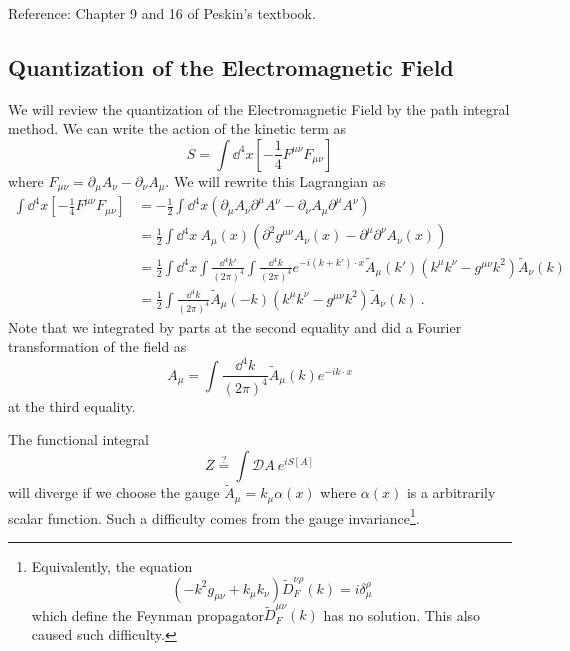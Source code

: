 \documentclass[a4paper,pdftex]{article}
\begin{document}
Reference: Chapter 9 and 16 of Peskin's textbook\cite{Peskin_IntroductionQuantum_1995}.

\subsection{Quantization of the Electromagnetic Field}

We will review the quantization of the Electromagnetic Field by the path integral method. We can write the action of the kinetic term as 
\begin{equation}
  S
  =
  \int\dd^4x \left[ -\frac{1}{4}F^{\mu\nu}F_{\mu\nu} \right]
\end{equation}
where $F_{\mu\nu}=\partial_{\mu}A_{\nu}-\partial_{\nu}A_{\mu}$. We will rewrite this Lagrangian as 
\begin{align}
  \int\dd^4x \left[ -\frac{1}{4}F^{\mu\nu}F_{\mu\nu} \right]
  &=
  -\frac{1}{2}
  \int\dd^4x
  (\partial_{\mu}A_{\nu}\partial^{\mu}A^{\nu}-\partial_{\nu}A_{\mu}\partial^{\mu}A^{\nu})
  \nonumber
  \\
  &=
  \frac{1}{2}
  \int\dd^4x\ 
  A_{\mu}(x)
  (\partial^2g^{\mu\nu}A_{\nu}(x)-\partial^{\mu}\partial^{\nu}A_{\nu}(x))
  \nonumber
  \\
  &=
  \frac{1}{2}\int\dd^4 x\int\frac{\dd^4 k'}{(2\pi)^4}\int\frac{\dd^4 k}{(2\pi)^4}e^{-i(k+k')\cdot x}
  \tilde{A}_{\mu}(k')
  (k^{\mu}k^{\nu}-g^{\mu\nu}k^2)
  \tilde{A}_{\nu}(k)
  \nonumber
  \\
  &=
  \frac{1}{2}
  \int\frac{\dd^4 k}{(2\pi)^4}
  \tilde{A}_{\mu}(-k)
  (k^{\mu}k^{\nu}-g^{\mu\nu}k^2)
  \tilde{A}_{\nu}(k)
  \ .
\end{align}
Note that we integrated by parts at the second equality and did a Fourier transformation of the field as
\begin{equation}
  A_{\mu}
  =
  \int\frac{\dd^4 k}{(2\pi)^4}
  \tilde{A}_{\mu}(k)e^{-ik\cdot x}
\end{equation}
at the third equality.

The functional integral
\begin{equation}
  Z
  \overset{?}{=}
  \int\mathcal{D}A\ 
  e^{iS[A]}
  \nonumber
\end{equation}
will diverge if we choose the gauge $\tilde{A}_{\mu}=k_{\mu}\alpha(x)$ where $\alpha(x)$ is a arbitrarily scalar function. Such a difficulty comes from the gauge invariance\footnote{
  Equivalently, the equation
  $$
    (-k^2g_{\mu\nu}+k_{\mu}k_{\nu})\tilde{D}_{F}^{\nu\rho}(k)
    =
    i\delta_{\mu}^{\rho}
  $$
  which define the Feynman propagator$\tilde{D}_{F}^{\mu\nu}(k)$ has no solution. This also caused such difficulty.
}. 
\end{document}
